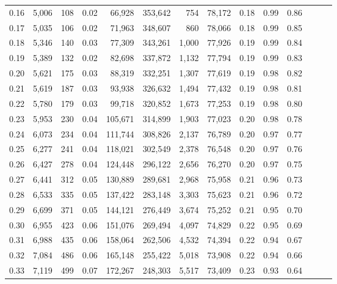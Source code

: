 \begin{tabular}{rrrrrrrrrrrrrr}
0.16 &   5,006 &    108 &  0.02 &   66,928 &  353,642 &     754 &  78,172 &  0.18 &  0.99 &      0.86 \\
0.17 &   5,035 &    106 &  0.02 &   71,963 &  348,607 &     860 &  78,066 &  0.18 &  0.99 &      0.85 \\
0.18 &   5,346 &    140 &  0.03 &   77,309 &  343,261 &   1,000 &  77,926 &  0.19 &  0.99 &      0.84 \\
0.19 &   5,389 &    132 &  0.02 &   82,698 &  337,872 &   1,132 &  77,794 &  0.19 &  0.99 &      0.83 \\
0.20 &   5,621 &    175 &  0.03 &   88,319 &  332,251 &   1,307 &  77,619 &  0.19 &  0.98 &      0.82 \\
0.21 &   5,619 &    187 &  0.03 &   93,938 &  326,632 &   1,494 &  77,432 &  0.19 &  0.98 &      0.81 \\
0.22 &   5,780 &    179 &  0.03 &   99,718 &  320,852 &   1,673 &  77,253 &  0.19 &  0.98 &      0.80 \\
0.23 &   5,953 &    230 &  0.04 &  105,671 &  314,899 &   1,903 &  77,023 &  0.20 &  0.98 &      0.78 \\
0.24 &   6,073 &    234 &  0.04 &  111,744 &  308,826 &   2,137 &  76,789 &  0.20 &  0.97 &      0.77 \\
0.25 &   6,277 &    241 &  0.04 &  118,021 &  302,549 &   2,378 &  76,548 &  0.20 &  0.97 &      0.76 \\
0.26 &   6,427 &    278 &  0.04 &  124,448 &  296,122 &   2,656 &  76,270 &  0.20 &  0.97 &      0.75 \\
0.27 &   6,441 &    312 &  0.05 &  130,889 &  289,681 &   2,968 &  75,958 &  0.21 &  0.96 &      0.73 \\
0.28 &   6,533 &    335 &  0.05 &  137,422 &  283,148 &   3,303 &  75,623 &  0.21 &  0.96 &      0.72 \\
0.29 &   6,699 &    371 &  0.05 &  144,121 &  276,449 &   3,674 &  75,252 &  0.21 &  0.95 &      0.70 \\
0.30 &   6,955 &    423 &  0.06 &  151,076 &  269,494 &   4,097 &  74,829 &  0.22 &  0.95 &      0.69 \\
0.31 &   6,988 &    435 &  0.06 &  158,064 &  262,506 &   4,532 &  74,394 &  0.22 &  0.94 &      0.67 \\
0.32 &   7,084 &    486 &  0.06 &  165,148 &  255,422 &   5,018 &  73,908 &  0.22 &  0.94 &      0.66 \\
0.33 &   7,119 &    499 &  0.07 &  172,267 &  248,303 &   5,517 &  73,409 &  0.23 &  0.93 &      0.64 \\

\end{tabular}
